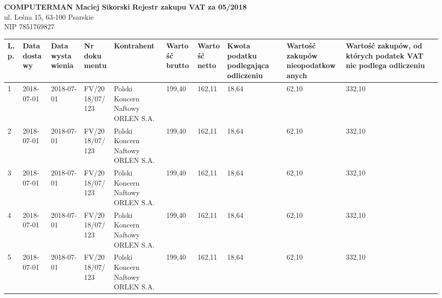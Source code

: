\documentclass[a4paper,10pt,landscape]{article}
\date{}
\begin{document}
	

\noindent
\textbf{COMPUTERMAN Maciej Sikorski} \hfill \textbf{\huge{Rejestr zakupu VAT za 05/2018}}\\
ul. Leśna 15, 63-100 Psarskie\\							
NIP 7851769827\\		
	
	

\begin{table}[H]
		\raggedleft
	\begin{tabular}{| p{} | p{2cm}  | p{2cm} | p{3cm}| p{4cm} | p{} | p{} | p{2cm} | p{2cm} |p{3cm} |}
		\hline
		\textbf{L.p.} & \textbf{Data dostawy} & \textbf{Data wystawienia} & \textbf{Nr dokumentu} & \textbf{Kontrahent} & \textbf{Wartość brutto} & \textbf{Wartość netto} & \textbf{Kwota podatku podlegająca odliczeniu} & \textbf{Wartość zakupów nieopodatkowanych} & \textbf{Wartość zakupów, od których podatek VAT nie podlega odliczeniu} \\ \hline
		1 & 2018-07-01 & 2018-07-01 & FV/2018/07/123 & Polski Koncern Naftowy ORLEN S.A. & 199,40 & 162,11 & 18,64 & 62,10 & 332,10 \\ \hline
				2 & 2018-07-01 & 2018-07-01 & FV/2018/07/123 & Polski Koncern Naftowy ORLEN S.A. & 199,40 & 162,11 & 18,64 & 62,10 & 332,10 \\ \hline
						3 & 2018-07-01 & 2018-07-01 & FV/2018/07/123 & Polski Koncern Naftowy ORLEN S.A. & 199,40 & 162,11 & 18,64 & 62,10 & 332,10 \\ \hline
								4 & 2018-07-01 & 2018-07-01 & FV/2018/07/123 & Polski Koncern Naftowy ORLEN S.A. & 199,40 & 162,11 & 18,64 & 62,10 & 332,10 \\ \hline
										5 & 2018-07-01 & 2018-07-01 & FV/2018/07/123 & Polski Koncern Naftowy ORLEN S.A. & 199,40 & 162,11 & 18,64 & 62,10 & 332,10 \\ \hline
		\hline
	\end{tabular}
\end{table}
\end{document}

